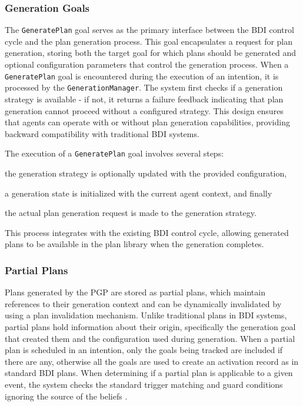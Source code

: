\documentclass[12pt,a4paper,openright,twoside]{book}
\begin{document}
\subsubsection{Generation Goals}

The \texttt{GeneratePlan} goal serves as the primary interface between the \ac{BDI} control cycle and the plan generation process.
%
This goal encapsulates a request for plan generation, storing both the target goal for which plans should be generated and optional configuration parameters that control the generation process.
%
When a \texttt{GeneratePlan} goal is encountered during the execution of an intention, it is processed by the \texttt{GenerationManager}.
%
The system first checks if a generation strategy is available - if not, it returns a failure feedback indicating that plan generation cannot proceed without a configured strategy.
%
This design ensures that agents can operate with or without plan generation capabilities, providing backward compatibility with traditional BDI systems.

The execution of a \texttt{GeneratePlan} goal involves several steps:
%
\begin{inlinelist}
    \item the generation strategy is optionally updated with the provided configuration,
    \item a generation state is initialized with the current agent context, and finally
    \item the actual plan generation request is made to the generation strategy.
\end{inlinelist} 
%
This process integrates with the existing \ac{BDI} control cycle, allowing generated plans to be available in the plan library when the generation completes.

\subsubsection{Partial Plans}

Plans generated by the \ac{PGP} are stored as partial plans, which maintain references to their generation context and can be dynamically invalidated by using a plan invalidation mechanism.
%
Unlike traditional plans in \ac{BDI} systems, partial plans hold information about their origin, specifically the generation goal that created them and the configuration used during generation.
%
When a partial plan is scheduled in an intention, only the goals being tracked are included if there are any, otherwise all the goals are used to create an activation record as in standard \ac{BDI} plans.
%
When determining if a partial plan is applicable to a given event, the system checks the standard trigger matching and guard conditions ignoring the source of the beliefs \footnotemark{}.
%
\end{document}
